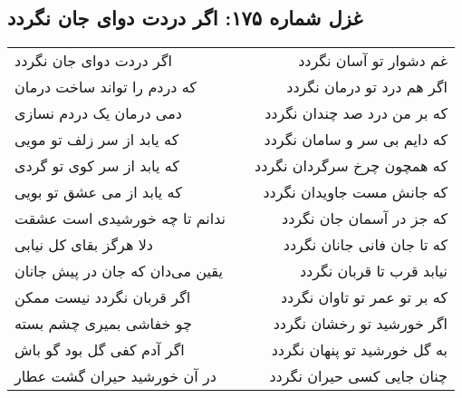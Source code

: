 \begin{center}
\section*{غزل شماره ۱۷۵: اگر دردت دوای جان نگردد}
\label{sec:175}
\begin{longtable}{l p{0.5cm} r}
اگر دردت دوای جان نگردد
&&
غم دشوار تو آسان نگردد
\\
که دردم را تواند ساخت درمان
&&
اگر هم درد تو درمان نگردد
\\
دمی درمان یک دردم نسازی
&&
که بر من درد صد چندان نگردد
\\
که یابد از سر زلف تو مویی
&&
که دایم بی سر و سامان نگردد
\\
که یابد از سر کوی تو گردی
&&
که همچون چرخ سرگردان نگردد
\\
که یابد از می عشق تو بویی
&&
که جانش مست جاویدان نگردد
\\
ندانم تا چه خورشیدی است عشقت
&&
که جز در آسمان جان نگردد
\\
دلا هرگز بقای کل نیابی
&&
که تا جان فانی جانان نگردد
\\
یقین می‌دان که جان در پیش جانان
&&
نیابد قرب تا قربان نگردد
\\
اگر قربان نگردد نیست ممکن
&&
که بر تو عمر تو تاوان نگردد
\\
چو خفاشی بمیری چشم بسته
&&
اگر خورشید تو رخشان نگردد
\\
اگر آدم کفی گل بود گو باش
&&
به گل خورشید تو پنهان نگردد
\\
در آن خورشید حیران گشت عطار
&&
چنان جایی کسی حیران نگردد
\\
\end{longtable}
\end{center}

